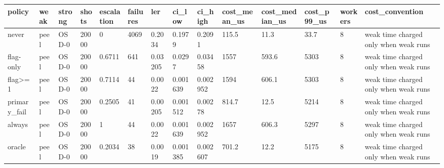 \begin{tabular}{llllllllllllll}
\hline
policy & weak & strong & shots & escalation & failures & ler & ci\_low & ci\_high & cost\_mean\_us & cost\_median\_us & cost\_p99\_us & workers & cost\_convention \\
\hline
never & peel & OSD-0 & 20000 & 0 & 4069 & 0.2034 & 0.1979 & 0.2091 & 115.5 & 11.3 & 33.7 & 8 & weak time charged only when weak runs \\
flag-only & peel & OSD-0 & 20000 & 0.6711 & 641 & 0.03205 & 0.0297 & 0.03458 & 1557 & 593.6 & 5303 & 8 & weak time charged only when weak runs \\
flag>=1 & peel & OSD-0 & 20000 & 0.7114 & 44 & 0.0022 & 0.001639 & 0.002952 & 1594 & 606.1 & 5303 & 8 & weak time charged only when weak runs \\
primary\_fail & peel & OSD-0 & 20000 & 0.2505 & 41 & 0.00205 & 0.001512 & 0.00278 & 814.7 & 12.5 & 5214 & 8 & weak time charged only when weak runs \\
always & peel & OSD-0 & 20000 & 1 & 44 & 0.0022 & 0.001639 & 0.002952 & 1657 & 606.3 & 5297 & 8 & weak time charged only when weak runs \\
oracle & peel & OSD-0 & 20000 & 0.2034 & 38 & 0.0019 & 0.001385 & 0.002607 & 701.2 & 12.2 & 5175 & 8 & weak time charged only when weak runs \\
\hline
\end{tabular}
